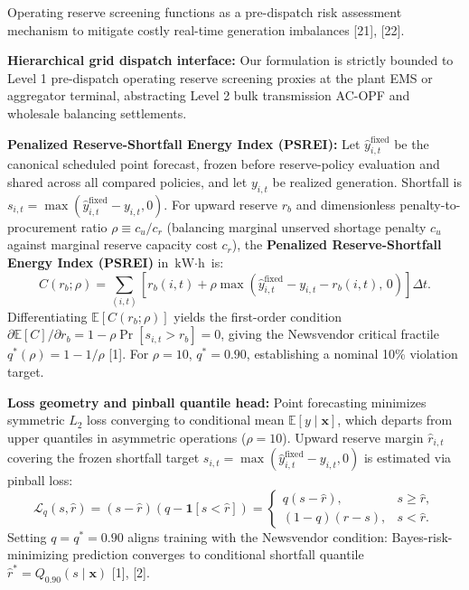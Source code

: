 \documentclass[
  journal]{IEEEtran}
\begin{document}
Operating reserve screening functions as a pre-dispatch risk assessment
mechanism to mitigate costly real-time generation imbalances {[}21{]},
{[}22{]}.

\textbf{Hierarchical grid dispatch interface:} Our formulation is
strictly bounded to Level 1 pre-dispatch operating reserve screening
proxies at the plant EMS or aggregator terminal, abstracting Level 2
bulk transmission AC-OPF and wholesale balancing settlements.

\textbf{Penalized Reserve-Shortfall Energy Index (PSREI):} Let
\(\hat{y}^{\mathrm{fixed}}_{i,t}\) be the canonical scheduled point
forecast, frozen before reserve-policy evaluation and shared across all
compared policies, and let \(y_{i,t}\) be realized generation. Shortfall
is \(s_{i,t} = \max(\hat{y}^{\mathrm{fixed}}_{i,t} - y_{i,t}, 0)\). For
upward reserve \(r_b\) and dimensionless penalty-to-procurement ratio
\(\rho \equiv c_u / c_r\) (balancing marginal unserved shortage penalty
\(c_u\) against marginal reserve capacity cost \(c_r\)), the
\textbf{Penalized Reserve-Shortfall Energy Index (PSREI)} in
\(\text{kW}\cdot\text{h}\) is: \begin{equation}
C(r_b; \rho) = \sum_{(i,t)} \left[ r_b(i,t) + \rho \max\left(\hat{y}^{\mathrm{fixed}}_{i,t} - y_{i,t} - r_b(i,t), \, 0\right) \right]\Delta t.
\label{eq:psrei}
\end{equation} Differentiating \(\mathbb{E}[C(r_b; \rho)]\) yields the
first-order condition
\(\partial \mathbb{E}[C]/\partial r_b = 1 - \rho \Pr[s_{i,t} > r_b] = 0\),
giving the Newsvendor critical fractile \(q^*(\rho) = 1 - 1/\rho\)
{[}1{]}. For \(\rho=10\), \(q^* = 0.90\), establishing a nominal 10\%
violation target.

\textbf{Loss geometry and pinball quantile head:} Point forecasting
minimizes symmetric \(L_2\) loss converging to conditional mean
\(\mathbb{E}[y \mid \mathbf{x}]\), which departs from upper quantiles in
asymmetric operations (\(\rho=10\)). Upward reserve margin
\(\hat{r}_{i,t}\) covering the frozen shortfall target
\(s_{i,t} = \max(\hat{y}^{\mathrm{fixed}}_{i,t} - y_{i,t}, 0)\) is
estimated via pinball loss: \begin{equation}
\mathcal{L}_q(s, \hat{r}) = (s - \hat{r})\left(q - \mathbf{1}[s < \hat{r}]\right) = \begin{cases} q (s - \hat{r}), & s \ge \hat{r}, \\ (1-q)(\hat{r} - s), & s < \hat{r}. \end{cases}
\label{eq:pinball}
\end{equation} Setting \(q = q^* = 0.90\) aligns training with the
Newsvendor condition: Bayes-risk-minimizing prediction converges to
conditional shortfall quantile
\(\hat{r}^* = Q_{0.90}(s \mid \mathbf{x})\) {[}1{]}, {[}2{]}.
\end{document}
